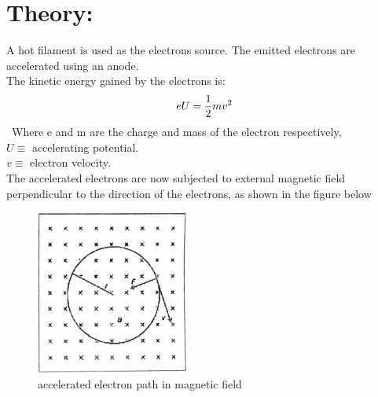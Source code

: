 \documentclass[10pt,a4paper]{report}
\begin{document}
\section*{\textbf{{Theory:}}} 
	{\large A hot filament is used as the electrons source.
	 The emitted electrons are accelerated using an anode.\\
		The kinetic energy gained by the electrons is:
		\begin{equation}
			eU=\frac{1}{2}mv^{2}\\
		\end{equation}\
		Where e and m are the charge and mass of the electron respectively,\\
		$U \equiv$ accelerating potential.\\
		$v \equiv$ electron velocity.\\
		The accelerated electrons are now subjected to external magnetic field
		 perpendicular to the direction of the electrons, as shown in the figure below}   
		\begin{figure}[h]
			\centering
			\includegraphics[width=5cm]{e-m}
			\caption[ljglk]{accelerated electron path in magnetic field}
		\end{figure}
		
\end{document}
